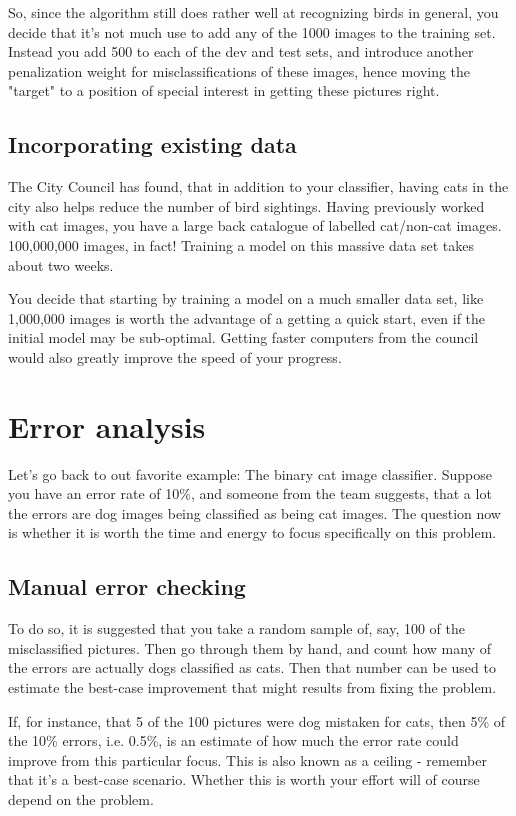 \documentclass[12pt, a4paper]{article}
\numberwithin{equation}{section}
\begin{document}
So, since the algorithm still does rather well at recognizing birds in general, you decide that it's not much use to add any of the 1000 images to the training set. Instead you add 500 to each of the dev and test sets, and introduce another penalization weight for misclassifications of these images, hence moving the "target" to a position of special interest in getting these pictures right.

\subsection{Incorporating existing data}
The City Council has found, that in addition to your classifier, having cats in the city also helps reduce the number of bird sightings. Having previously worked with cat images, you have a large back catalogue of labelled cat/non-cat images. 100,000,000 images, in fact! Training a model on this massive data set takes about two weeks.

You decide that starting by training a model on a much smaller data set, like 1,000,000 images is worth the advantage of a getting a quick start, even if the initial model may be sub-optimal. Getting faster computers from the council would also greatly improve the speed of your progress.


\section{Error analysis}
Let's go back to out favorite example: The binary cat image classifier. Suppose you have an error rate of 10\%, and someone from the team suggests, that a lot the errors are dog images being classified as being cat images. The question now is whether it is worth the time and energy to focus specifically on this problem.

\subsection{Manual error checking}
To do so, it is suggested that you take a random sample of, say, 100 of the misclassified pictures. Then go through them by hand, and count how many of the errors are actually dogs classified as cats. Then that number can be used to estimate the best-case improvement that might results from fixing the problem.

If, for instance, that 5 of the 100 pictures were dog mistaken for cats, then 5\% of the 10\% errors, i.e. 0.5\%, is an estimate of how much the error rate could improve from this particular focus. This is also known as a ceiling - remember that it's a best-case scenario. Whether this is worth your effort will of course depend on the problem.
\end{document}
